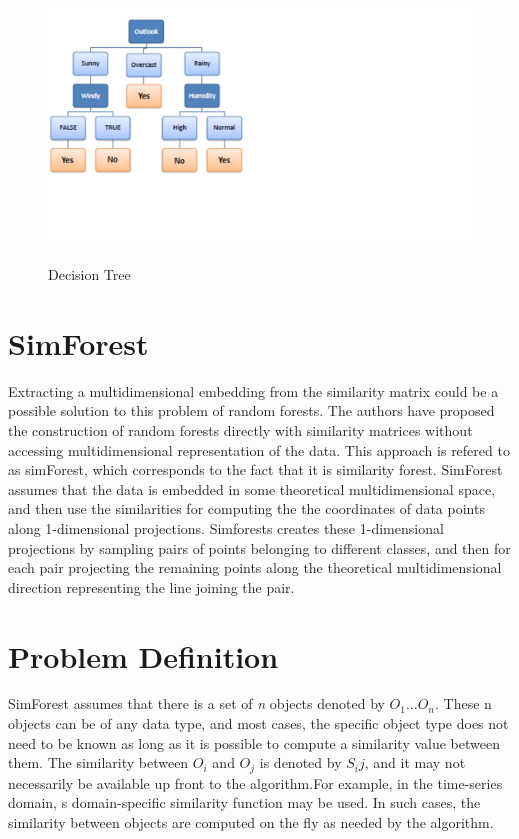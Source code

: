 \documentclass{article}
\begin{document}
\begin{figure}[H]
	\centering
    \caption{Decision Tree}
    \includegraphics{decisiontree}
    \label{fig:decisiontree}
\end{figure}

\section{SimForest}

Extracting a multidimensional embedding from the similarity matrix could be a possible solution to this problem of random forests. The authors have proposed the construction of random forests directly with similarity matrices without accessing multidimensional representation of the data. This approach is refered to as simForest, which corresponds to the fact that it is similarity forest. SimForest assumes that the data is embedded in some theoretical multidimensional space, and then use the similarities for computing the the coordinates of data points along 1-dimensional projections. Simforests creates these 1-dimensional projections by sampling pairs of points belonging to different classes, and then for each pair projecting the remaining points along the theoretical multidimensional direction representing the line joining the pair.  \\


\section{Problem Definition}
SimForest assumes that there is a set of \textit{n} objects denoted by $O_1$...$O_n$. These n objects can be of any data type, and most cases, the specific object type does not need to be known as long as it is possible to compute a similarity value between them. The similarity between $O_i$ and $O_j$ is denoted by $S_ij$, and it may not necessarily be available up front to the algorithm.For example, in the time-series domain, s domain-specific similarity function may be used. In such cases, the similarity between objects are computed on the fly as needed by the algorithm.\\
\end{document}
